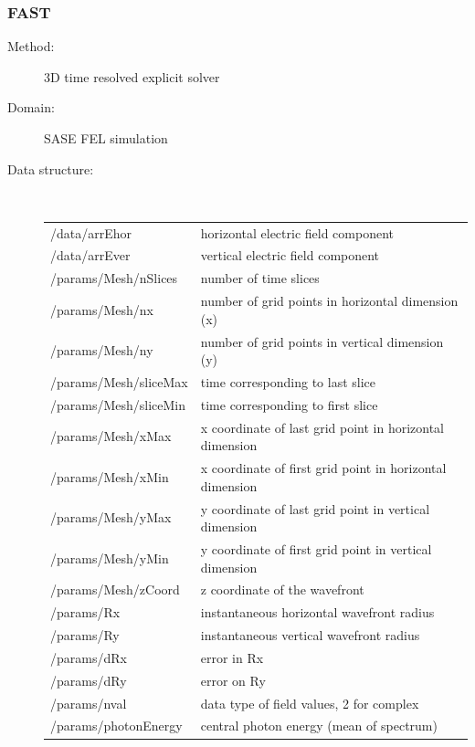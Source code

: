 \documentclass[12pt]{scrartcl}
\begin{document}
\subsubsection{FAST\label{sec:interface_source_fast}}
\begin{description}
  \item[Method:] 3D time resolved explicit solver
  \item[Domain:] SASE FEL simulation
  \item[Data structure:]\ \\
    {\scriptsize%
   \begin{tabular}{l|l}
      \hline
      \hline
      /data/arrEhor     & horizontal electric field component \\
      /data/arrEver     & vertical electric field component \\
      /params/Mesh/nSlices    & number of time slices \\
      /params/Mesh/nx     & number of grid points in horizontal dimension (x) \\
      /params/Mesh/ny     & number of grid points in vertical dimension (y) \\
      /params/Mesh/sliceMax     & time corresponding to last slice \\
      /params/Mesh/sliceMin     & time corresponding to first slice \\
      /params/Mesh/xMax     & x coordinate of last grid point in horizontal dimension \\
      /params/Mesh/xMin     & x coordinate of first grid point in horizontal dimension \\
      /params/Mesh/yMax     & y coordinate of last grid point in vertical dimension \\
      /params/Mesh/yMin     & y coordinate of first grid point in vertical dimension \\
      /params/Mesh/zCoord     & z coordinate of the wavefront \\
      /params/Rx    &  instantaneous horizontal wavefront radius\\
      /params/Ry    &  instantaneous vertical wavefront radius\\
      /params/dRx     & error in Rx \\
      /params/dRy     & error on Ry \\
      /params/nval    &  data type of field values, 2 for complex \\
      /params/photonEnergy    & central photon energy (mean of spectrum) \\

\end{tabular}}
\end{description}
\end{document}

